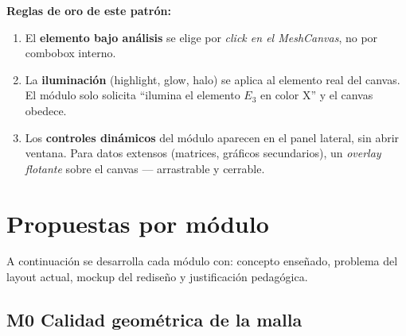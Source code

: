 \documentclass[11pt,a4paper]{article}
\begin{document}
\textbf{Reglas de oro de este patrón:}
\begin{enumerate}[leftmargin=1.2em, itemsep=2pt]
  \item El \textbf{elemento bajo análisis} se elige por \emph{click en el
        MeshCanvas}, no por combobox interno.
  \item La \textbf{iluminación} (highlight, glow, halo) se aplica al
        elemento real del canvas. El módulo solo solicita ``ilumina el
        elemento $E_3$ en color X'' y el canvas obedece.
  \item Los \textbf{controles dinámicos} del módulo aparecen en el panel
        lateral, sin abrir ventana. Para datos extensos (matrices,
        gráficos secundarios), un \emph{overlay flotante} sobre el
        canvas — arrastrable y cerrable.
\end{enumerate}

\newpage

\section{Propuestas por módulo}

A continuación se desarrolla cada módulo con: concepto enseñado, problema
del layout actual, mockup del rediseño y justificación pedagógica.

\subsection{M0 \textbar{} Calidad geométrica de la malla}
\end{document}
